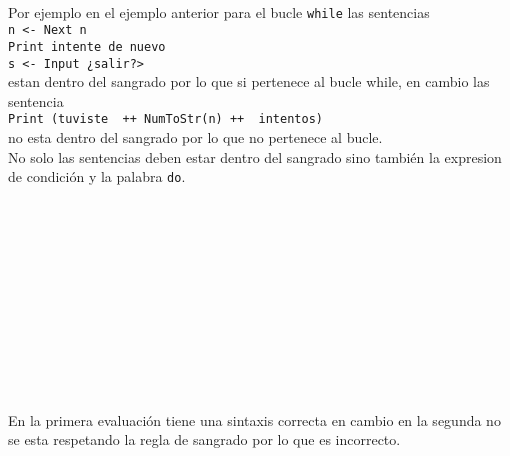       \begin{fxcode}
         \\
      \end{fxcode}
      
      Por ejemplo en el ejemplo anterior para el bucle \texttt{while} las sentencias\\
      \texttt{n~<- Next n        }\\     
      \texttt{Print \textquotedbl intente de nuevo\textquotedbl}\\
      \texttt{s~<- Input \textquotedbl ¿salir?>~\textquotedbl}\\
      estan dentro del sangrado por lo que si pertenece al bucle while, en cambio las sentencia\\
      \texttt{Print (\textquotedbl tuviste~\textquotedbl~++~NumToStr(n)~++~\textquotedbl ~intentos\textquotedbl)}\\
      no esta dentro del sangrado por lo que no pertenece al bucle.
      \\
      
      No solo las sentencias deben estar dentro del sangrado sino también la expresion de condición y la palabra \texttt{do}.
      
      \begin{fxcode}
         \\
         \\
         \\
         \\
         \\
         \\
         \\
         \\
          \\
         \\
      \end{fxcode}
      
      En la primera evaluación tiene una sintaxis correcta en cambio en la segunda no se esta respetando la regla de sangrado por lo que es incorrecto.
      \\
      
